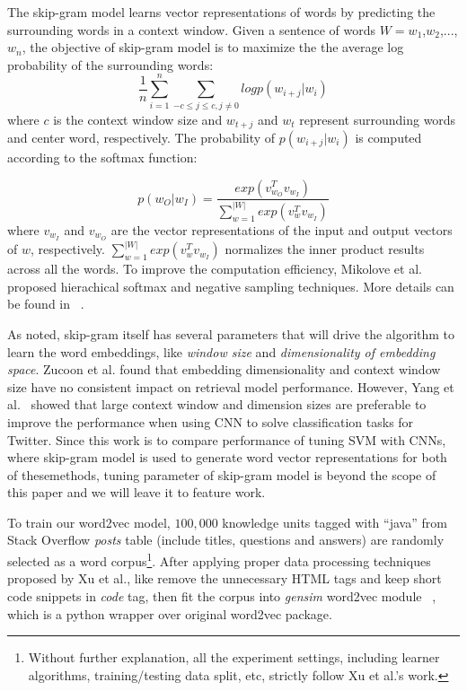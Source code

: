 The skip-gram model learns vector representations of words
 by predicting the surrounding words in a context window. 
 Given a sentence of words $W =w_1$,$w_2$,...,$w_n$, the objective of skip-gram model is to maximize the
 the average log probability of the surrounding words:
 \begin{equation*}
 \frac{1}{n}\sum_{i=1}^{n} \sum_{-c\leq j \leq c, j \neq 0} log p(w_{i+j}|w_i)
\end{equation*}
where $c$ is the context window size and $w_{t+j}$ and $w_{t}$ represent surrounding words and center word, respectively.
The probability of $p(w_{i+j}|w_i)$ is computed according to the softmax function:

\begin{equation*}
p(w_O|w_I) = \frac{exp(v_{w_O}^Tv_{w_I})}{\sum_{w=1}^{|W|}exp(v_{w}^Tv_{w_I})}
\end{equation*}
where $v_{w_I}$ and $v_{w_O}$ are the vector representations of the input and output vectors of $w$, respectively. 
$\sum_{w=1}^{|W|}exp(v_{w}^Tv_{w_I})$  normalizes the inner product results across all the words.
To improve the computation efficiency, Mikolove et al. \cite{mikolov2013distributed} proposed
hierachical softmax and negative sampling
techniques. More details can be found in ~\cite{mikolov2013distributed}.

As noted, skip-gram itself has several parameters that will drive the algorithm 
to learn the word embeddings,  like {\it window size} and {\it dimensionality of embedding space}. 
Zucoon et al. \cite{zuccon2015integrating} found that embedding dimensionality
and context window size have no consistent impact on retrieval model performance. However,
Yang et al.~\cite{yang2016using} showed that large context window and dimension
 sizes are preferable to improve the performance when using CNN to solve  classification tasks
 for Twitter. Since this work is to compare performance of  tuning SVM  with CNNs, where
 skip-gram model is used to generate word vector representations for both of thesemethods, 
 tuning parameter of skip-gram model is beyond the scope of this paper and we will leave it to feature work.
 
 

To train our word2vec model, $100,000$ knowledge units tagged with ``java'' from
Stack Overflow {\it posts} table  (include titles, questions and answers)
are randomly selected as a word corpus\footnote{Without further explanation, 
all the experiment settings, including learner algorithms,
training/testing data split, etc, strictly follow Xu et al.'s work. }. 
After applying proper data processing techniques proposed by Xu et al., like
 remove the unnecessary HTML tags and keep short code snippets in
{\it code} tag, then fit the corpus into {\it gensim} word2vec module ~\cite{rehurek_lrec},
which is a python wrapper over original word2vec package.

